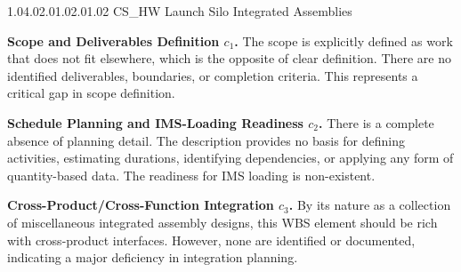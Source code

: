 \begin{frame}{1.04.02.01.02.01.02 CS\_HW Launch Silo Integrated Assemblies}
\begin{minipage}{0.90\textwidth}
\raggedright
\fontsize{8}{9.5}\selectfont
\textbf{Scope and Deliverables Definition \(c_1\).}
The scope is explicitly defined as work that does not fit elsewhere, which is the opposite of clear definition. There are no identified deliverables, boundaries, or completion criteria. This represents a critical gap in scope definition.\par\vspace{0.6em}
\textbf{Schedule Planning and IMS-Loading Readiness \(c_2\).}
There is a complete absence of planning detail. The description provides no basis for defining activities, estimating durations, identifying dependencies, or applying any form of quantity-based data. The readiness for IMS loading is non-existent.\par\vspace{0.6em}
\textbf{Cross-Product/Cross-Function Integration \(c_3\).}
By its nature as a collection of miscellaneous integrated assembly designs, this WBS element should be rich with cross-product interfaces. However, none are identified or documented, indicating a major deficiency in integration planning.\par\vspace{0.6em}
\end{minipage}
\end{frame}

\endinput
